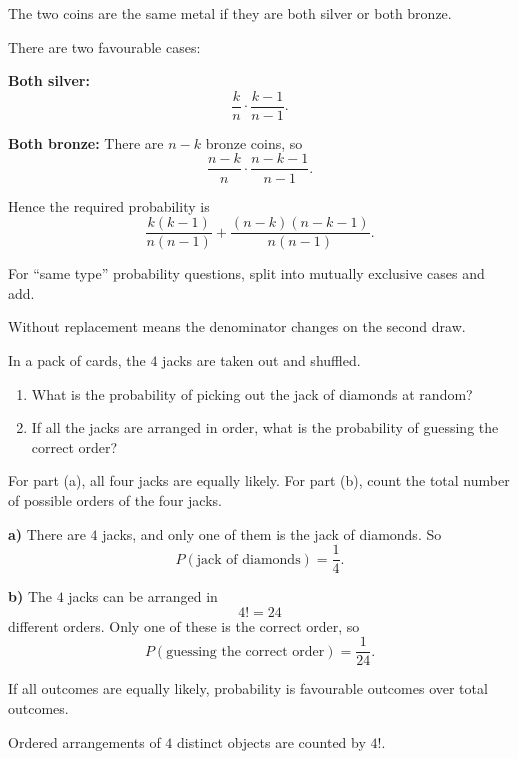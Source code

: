 \begin{hint}
The two coins are the same metal if they are both silver or both bronze.
\end{hint}

\begin{solution}
There are two favourable cases:

\textbf{Both silver:}
\[
\frac{k}{n}\cdot \frac{k-1}{n-1}.
\]

\textbf{Both bronze:}
There are $n-k$ bronze coins, so
\[
\frac{n-k}{n}\cdot \frac{n-k-1}{n-1}.
\]

Hence the required probability is
\[
\boxed{
\frac{k(k-1)}{n(n-1)}+\frac{(n-k)(n-k-1)}{n(n-1)}
}.
\]
\end{solution}

\begin{takeaways}
\item For ``same type'' probability questions, split into mutually exclusive cases and add.
\item Without replacement means the denominator changes on the second draw.
\end{takeaways}

\begin{problem}
In a pack of cards, the $4$ jacks are taken out and shuffled.
\begin{enumerate}[label=\alph*)]
\item What is the probability of picking out the jack of diamonds at random?
\item If all the jacks are arranged in order, what is the probability of guessing the correct order?
\end{enumerate}
\end{problem}

\begin{hint}
For part (a), all four jacks are equally likely. For part (b), count the total number of possible orders of the four jacks.
\end{hint}

\begin{solution}
\textbf{a)} There are $4$ jacks, and only one of them is the jack of diamonds. So
\[
P(\text{jack of diamonds})=\frac{1}{4}.
\]

\textbf{b)} The $4$ jacks can be arranged in
\[
4!=24
\]
different orders. Only one of these is the correct order, so
\[
P(\text{guessing the correct order})=\frac{1}{24}.
\]
\end{solution}

\begin{takeaways}
\item If all outcomes are equally likely, probability is favourable outcomes over total outcomes.
\item Ordered arrangements of $4$ distinct objects are counted by $4!$.
\end{takeaways}

